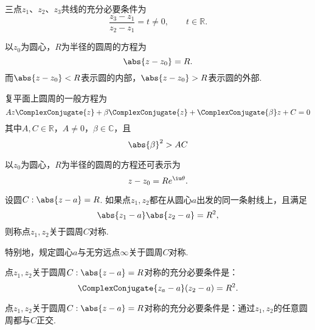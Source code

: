 \begin{example}[三点共线的充分必要条件]
三点\(z_1\)、\(z_2\)、\(z_3\)共线的充分必要条件为\begin{equation*}
\frac{z_3 - z_1}{z_2 - z_1} = t \neq 0, \qquad t \in \mathbb{R}.
\end{equation*}
\end{example}

\begin{example}[圆]
以\(z_0\)为圆心，\(R\)为半径的圆周的方程为\begin{equation*}
\abs{z - z_0} = R.
\end{equation*}而\(\abs{z-z_0}<R\)表示圆的内部，\(\abs{z-z_0}>R\)表示圆的外部.

复平面上圆周的一般方程为\begin{equation*}
A z \ComplexConjugate{z} + \beta \ComplexConjugate{z} + \ComplexConjugate{\beta} z + C = 0
\end{equation*}其中\(A,C\in\mathbb{R}\)，\(A \neq 0\)，\(\beta\in\mathbb{C}\)，且\begin{equation*}
\abs{\beta}^2 > AC
\end{equation*}

以\(z_0\)为圆心，\(R\)为半径的圆周的方程还可表示为\begin{equation*}
z - z_0 = R e^{\iu \theta}.
\end{equation*}
\end{example}

\begin{definition}
设圆\(C: \abs{z - a} = R\).
如果点\(z_1,z_2\)都在从圆心\(a\)出发的同一条射线上，且满足\begin{equation*}
\abs{z_1 - a} \abs{z_2 - a} = R^2,
\end{equation*}则称点\(z_1,z_2\)关于圆周\(C\)对称.

特别地，规定圆心\(a\)与无穷远点\(\infty\)关于圆周\(C\)对称.
\end{definition}

\begin{theorem}
点\(z_1,z_2\)关于圆周\(C: \abs{z - a} = R\)对称的充分必要条件是：\begin{equation*}
\ComplexConjugate{z_a - a} (z_2 - a) = R^2.
\end{equation*}
\end{theorem}

\begin{theorem}
点\(z_1,z_2\)关于圆周\(C: \abs{z - a} = R\)对称的充分必要条件是：通过\(z_1,z_2\)的任意圆周都与\(C\)正交.
\end{theorem}

